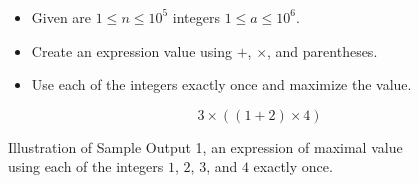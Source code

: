\begin{frame}
    \frametitle{\problemtitle}

    \begin{columns}
        \begin{column}[T]{.70\textwidth}
            \begin{itemize}
                \item Given are $1 \leq n \leq 10^5$ integers $1\leq a\leq 10^6$.
                \item Create an expression value using $+$, $\times$, and parentheses.
                \item Use each of the integers exactly once and maximize the value.
            \end{itemize}

            \vspace{1em}

            \centering
            $$3\times ((1+2)\times 4)$$

            \small
            Illustration of Sample Output 1, an expression of maximal value \\
            using each of the integers $1$, $2$, $3$, and $4$ exactly once.
        \end{column}

    \end{columns}
\end{frame}
